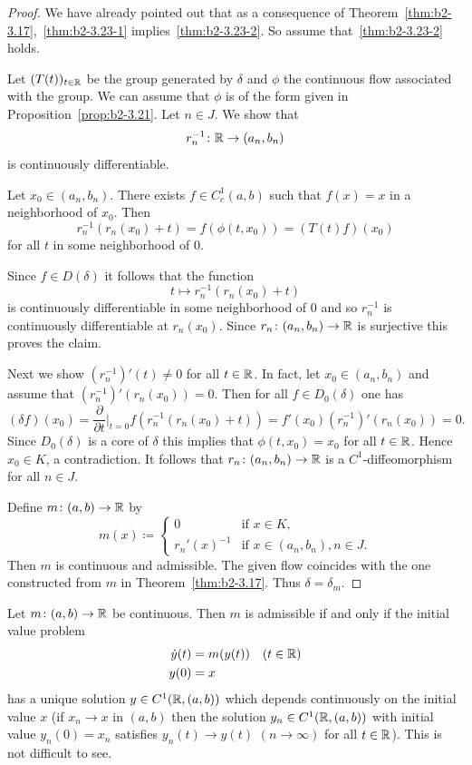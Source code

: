 \begin{proof}
We have already pointed out that as a consequence of Theorem~\ref{thm:b2-3.17},~\ref{thm:b2-3.23-1} implies~\ref{thm:b2-3.23-2}.
So assume that~\ref{thm:b2-3.23-2} holds.

Let $(T(t))_{t \in \mathbb{R}}$ be the group generated by $\delta$ and $\phi$ the continuous flow associated with the group.
We can assume that $\phi$ is of the form given in Proposition~\ref{prop:b2-3.21}.
Let $n \in J$.
We show that 
%
\[
	r_{n}^{-1} \colon \mathbb{R} \to (a_{n},b_{n})
\]
%
is continuously differentiable.

Let $x_{0} \in (a_{n},b_{n})$.
There exists $f \in C_{c}^{1}(a,b)$ such that $f(x) = x$ in a neighborhood of\/ $x_{0}$.
Then 
%
\[
	r_{n}^{-1}(r_{n}(x_{0}) + t) = f(\phi(t,x_{0})) = (T(t)f)(x_{0})
\]
%
for all $t$ in some neighborhood of\/ $0$.

Since $f \in D(\delta)$ it follows that the function 
%
\[
	t \mapsto r_{n}^{-1}(r_{n}(x_{0}) + t)
\]
%
is continuously differentiable in some neighborhood of\/ $0$ and so $r_{n}^{-1}$ is continuously differentiable at $r_{n}(x_{0})$.
Since $r_{n} \colon (a_{n},b_{n}) \to \mathbb{R}$ is surjective this proves the claim.

Next we show $(r_{n}^{-1})'(t) \neq 0$ for all $t \in \mathbb{R}$.
In fact, let $x_{0} \in (a_{n},b_{n})$ and assume that $(r_{n}^{-1})'(r_{n}(x_{0})) = 0$.
Then for all $f \in D_{0}(\delta)$ one has 
\[
(\delta f)(x_{0}) = \frac{\partial}{\partial t}\bigg|_{t=0} f(r_{n}^{-1}(r_{n}(x_{0}) + t)) = f'(x_{0})(r_{n}^{-1})'(r_{n}(x_{0})) = 0.
\]
Since $D_{0}(\delta)$ is a core of\/ $\delta$ this implies that $\phi(t,x_{0}) = x_{0}$ for all $t \in \mathbb{R}$.
Hence $x_{0} \in K$, a contradiction.
It follows that $r_{n} \colon (a_{n},b_{n}) \to \mathbb{R}$ is a $C^{1}$-diffeomorphism for all $n \in J$.

Define $m \colon (a,b) \to \mathbb{R}$ by
\begin{equation*}\label{eq:b2-m-def}
m(x) \coloneq \begin{cases}
    0 & \text{if } x \in K  ,\\
    r_{n}'(x)^{-1} & \text{if } x \in (a_{n},b_{n}), n \in J  .
\end{cases}
\end{equation*}
Then $m$ is continuous and admissible.
The given flow coincides with the one constructed from $m$ in Theorem~\ref{thm:b2-3.17}.
Thus $\delta = \delta_{m}$.
\end{proof}
\begin{remark*}\label{rem:b2-3.24}
%
Let $m \colon (a,b) \to \mathbb{R}$ be continuous.
Then $m$ is admissible if and only if the initial value problem
\begin{align*}
\dot{y}(t) &= m(y(t)) \quad (t \in \mathbb{R}) \\
y(0) &= x
\end{align*}
has a unique solution $y \in C^{1}(\mathbb{R},(a,b))$ which depends continuously on the initial value $x$ (\ie  if\/ $x_{n} \to x$ in $(a,b)$ then the solution $y_{n} \in C^{1}(\mathbb{R},(a,b))$ with initial value $y_{n}(0) = x_{n}$ satisfies $y_{n}(t) \to y(t)$ $(n \to \infty)$ for all $t \in \mathbb{R}$).
This is not difficult to see.
\end{remark*}
